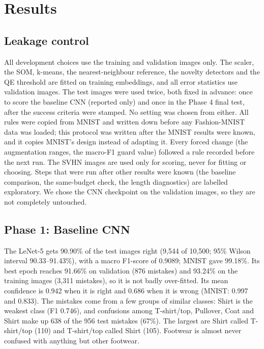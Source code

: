 \documentclass[11pt]{article}
\begin{document}
\section{Results}
\label{sec:results}

\subsection{Leakage control}

All development choices use the training and validation images only. The scaler, the SOM, k-means, the nearest-neighbour reference, the novelty detectors and the QE threshold are fitted on training embeddings, and all error statistics use validation images.
The test images were used twice, both fixed in advance: once to score the baseline CNN (reported only) and once in the Phase 4 final test, after the success criteria were stamped. No setting was chosen from either.
All rules were copied from MNIST and written down before any Fashion-MNIST data was loaded; this protocol was written after the MNIST results were known, and it copies MNIST's design instead of adapting it. Every forced change (the augmentation ranges, the macro-F1 guard value) followed a rule recorded before the next run.
The SVHN images are used only for scoring, never for fitting or choosing. Steps that were run after other results were known (the baseline comparison, the same-budget check, the length diagnostics) are labelled exploratory. We chose the CNN checkpoint on the validation images, so they are not completely untouched.

\subsection{Phase 1: Baseline CNN}

The LeNet-5 gets 90.90\% of the test images right (9,544 of 10,500; 95\% Wilson interval 90.33--91.43\%), with a macro F1-score of 0.9089; MNIST gave 99.18\%. Its best epoch reaches 91.66\% on validation (876 mistakes) and 93.24\% on the training images (3,311 mistakes), so it is not badly over-fitted.
Its mean confidence is 0.942 when it is right and 0.686 when it is wrong (MNIST: 0.997 and 0.833). The mistakes come from a few groups of similar classes: Shirt is the weakest class (F1 0.746), and confusions among T-shirt/top, Pullover, Coat and Shirt make up 638 of the 956 test mistakes (67\%). The largest are Shirt called T-shirt/top (110) and T-shirt/top called Shirt (105). Footwear is almost never confused with anything but other footwear.
\end{document}
